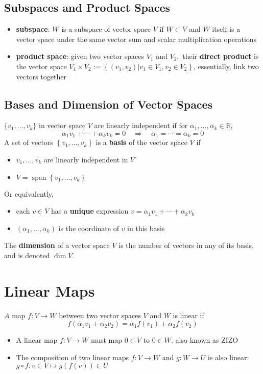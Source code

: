 \documentclass[10pt,a4paper,oneside]{article}
\begin{document}
\subsection{Subspaces and Product Spaces}
\begin{itemize}
	\item \textbf{subspace}: $W$ is a subspace of vector space $V$ if $W \subset V$ and $W$ itself is a vector space under the same vector sum and scalar multiplication operations
	\item \textbf{product space}: given two vector spaces $V_{1}$ and $V_{2},$ their \textbf{direct product} is the vector
	space $V_{1} \times V_{2} :=\left\{\left(v_{1}, v_{2}\right) | v_{1} \in V_{1}, v_{2} \in V_{2}\right\}$, essentially, link two vectors together
\end{itemize}



\subsection{Bases and Dimension of Vector Spaces}
$\{v_{1}, \ldots, v_{k}\}$ in vector space $V$ are linearly independent if for $\alpha_{1}, \ldots, \alpha_{k} \in \mathbb{R}$,
\[
\alpha_{1} v_{1}+\cdots+\alpha_{k} v_{k}=0 \quad \Rightarrow \quad \alpha_{1}=\cdots=\alpha_{k}=0
\]
A set of vectors $\left\{v_{1}, \ldots, v_{k}\right\}$ is a \textbf{basis} of the vector space $V$ if
\begin{itemize}
\item $v_{1}, \ldots, v_{k}$ are linearly independent in $V$
\item $V=\operatorname{span}\left\{v_{1}, \ldots, v_{k}\right\}$
\end{itemize}
Or equivalently,
\begin{itemize}
\item each $v \in V$ has a \textbf{unique} expression $v=\alpha_{1} v_{1}+\cdots+\alpha_{k} v_{k}$
\item $\left(\alpha_{1}, \ldots, \alpha_{k}\right)$ is the coordinate of $v$ in this basis
\end{itemize}
The \textbf{dimension} of a vector space $V$ is the number of vectors in any of its basis, and is denoted $\dim V$.

\section{Linear Maps}
$A$ map $f : V \rightarrow W$ between two vector spaces $V$ and $W$ is linear if
\[
f\left(\alpha_{1} v_{1}+\alpha_{2} v_{2}\right)=\alpha_{1} f\left(v_{1}\right)+\alpha_{2} f\left(v_{2}\right)
\]
\begin{itemize}
\item A linear map $f : V \rightarrow W$ must map $0 \in V$ to $0\in W$, also known as ZIZO
\item The composition of two linear maps $f:V\rightarrow W$ and $g:W\rightarrow U$ is also linear: $g \circ f : v \in V \mapsto g(f(v)) \in U$
\end{itemize}
\end{document}
